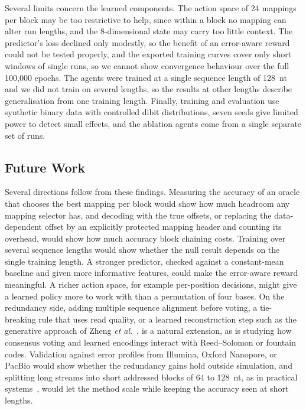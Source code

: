 \documentclass[entropy,article,submit,moreauthors]{Definitions/mdpi}
\begin{document}
Several limits concern the learned components. The action space of 24 mappings per block may be too restrictive to help, since within a block no mapping can alter run lengths, and the 8-dimensional state may carry too little context. The predictor's loss declined only modestly, so the benefit of an error-aware reward could not be tested properly, and the exported training curves cover only short windows of single runs, so we cannot show convergence behaviour over the full 100{,}000 epochs. The agents were trained at a single sequence length of 128~nt and we did not train on several lengths, so the results at other lengths describe generalisation from one training length. Finally, training and evaluation use synthetic binary data with controlled dibit distributions, seven seeds give limited power to detect small effects, and the ablation agents come from a single separate set of runs.

\subsection{Future Work}
\label{sec:future_work}

Several directions follow from these findings. Measuring the accuracy of an oracle that chooses the best mapping per block would show how much headroom any mapping selector has, and decoding with the true offsets, or replacing the data-dependent offset by an explicitly protected mapping header and counting its overhead, would show how much accuracy block chaining costs. Training over several sequence lengths would show whether the null result depends on the single training length. A stronger predictor, checked against a constant-mean baseline and given more informative features, could make the error-aware reward meaningful. A richer action space, for example per-position decisions, might give a learned policy more to work with than a permutation of four bases. On the redundancy side, adding multiple sequence alignment before voting, a tie-breaking rule that uses read quality, or a learned reconstruction step such as the generative approach of Zheng \textit{et al.}~\cite{zheng2024dnagan}, is a natural extension, as is studying how consensus voting and learned encodings interact with Reed--Solomon or fountain codes. Validation against error profiles from Illumina, Oxford Nanopore, or PacBio would show whether the redundancy gains hold outside simulation, and splitting long streams into short addressed blocks of 64 to 128~nt, as in practical systems~\cite{organick2018}, would let the method scale while keeping the accuracy seen at short lengths.
\end{document}
